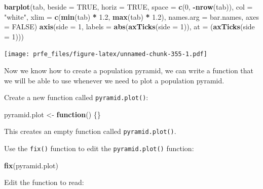 \documentclass[12pt,]{book}
\newenvironment{Shaded}{\begin{snugshade}}{\end{snugshade}}
\newcommand{\KeywordTok}[1]{\textcolor[rgb]{0.13,0.29,0.53}{\textbf{#1}}}
\newcommand{\DataTypeTok}[1]{\textcolor[rgb]{0.13,0.29,0.53}{#1}}
\newcommand{\DecValTok}[1]{\textcolor[rgb]{0.00,0.00,0.81}{#1}}
\newcommand{\FloatTok}[1]{\textcolor[rgb]{0.00,0.00,0.81}{#1}}
\newcommand{\StringTok}[1]{\textcolor[rgb]{0.31,0.60,0.02}{#1}}
\newcommand{\OtherTok}[1]{\textcolor[rgb]{0.56,0.35,0.01}{#1}}
\newcommand{\ControlFlowTok}[1]{\textcolor[rgb]{0.13,0.29,0.53}{\textbf{#1}}}
\newcommand{\OperatorTok}[1]{\textcolor[rgb]{0.81,0.36,0.00}{\textbf{#1}}}
\newcommand{\NormalTok}[1]{#1}
\theoremstyle{definition}
\theoremstyle{definition}
\theoremstyle{definition}
\theoremstyle{remark}
\begin{document}
\begin{Shaded}
\begin{Highlighting}[]
\KeywordTok{barplot}\NormalTok{(tab, }\DataTypeTok{beside =} \OtherTok{TRUE}\NormalTok{, }\DataTypeTok{horiz =} \OtherTok{TRUE}\NormalTok{, }\DataTypeTok{space =} \KeywordTok{c}\NormalTok{(}\DecValTok{0}\NormalTok{, }\OperatorTok{-}\KeywordTok{nrow}\NormalTok{(tab)),}
        \DataTypeTok{col =} \StringTok{"white"}\NormalTok{, }\DataTypeTok{xlim =} \KeywordTok{c}\NormalTok{(}\KeywordTok{min}\NormalTok{(tab) }\OperatorTok{*}\StringTok{ }\FloatTok{1.2}\NormalTok{, }\KeywordTok{max}\NormalTok{(tab) }\OperatorTok{*}\StringTok{ }\FloatTok{1.2}\NormalTok{),}
        \DataTypeTok{names.arg =}\NormalTok{ bar.names, }\DataTypeTok{axes =} \OtherTok{FALSE}\NormalTok{)}
\KeywordTok{axis}\NormalTok{(}\DataTypeTok{side =} \DecValTok{1}\NormalTok{,}
     \DataTypeTok{labels =} \KeywordTok{abs}\NormalTok{(}\KeywordTok{axTicks}\NormalTok{(}\DataTypeTok{side =} \DecValTok{1}\NormalTok{)),}
     \DataTypeTok{at =}\NormalTok{ (}\KeywordTok{axTicks}\NormalTok{(}\DataTypeTok{side =} \DecValTok{1}\NormalTok{)))}
\end{Highlighting}
\end{Shaded}

\texttt{[image: prfe\_files/figure-latex/unnamed-chunk-355-1.pdf]}

Now we know how to create a population pyramid, we can write a function
that we will be able to use whenever we need to plot a population
pyramid.

Create a new function called \texttt{pyramid.plot()}:

\begin{Shaded}
\begin{Highlighting}[]
\NormalTok{pyramid.plot <-}\StringTok{ }\ControlFlowTok{function}\NormalTok{() \{\}}
\end{Highlighting}
\end{Shaded}

This creates an empty function called \texttt{pyramid.plot()}.

Use the \texttt{fix()} function to edit the \texttt{pyramid.plot()}
function:

\begin{Shaded}
\begin{Highlighting}[]
\KeywordTok{fix}\NormalTok{(pyramid.plot)}
\end{Highlighting}
\end{Shaded}

Edit the function to read:
\end{document}
